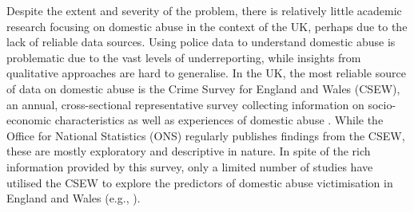 \documentclass[11pt, a4paper]{article}
\begin{document}
Despite the extent and severity of the problem, there is relatively little academic research focusing on domestic abuse in the context of the UK, perhaps due to the lack of reliable data sources. Using police data to understand domestic abuse is problematic due to the vast levels of underreporting, while insights from qualitative approaches are hard to generalise. In the UK, the most reliable source of data on domestic abuse is the Crime Survey for England and Wales (CSEW), an annual, cross-sectional representative survey collecting information on socio-economic characteristics as well as experiences of domestic abuse \cite{OfficeforNationalStatistics2019}.  While the Office for National Statistics (ONS) regularly publishes findings from the CSEW, these are mostly exploratory and descriptive in nature. In spite of the rich information provided by this survey, only a limited number of studies have utilised the CSEW to explore the predictors of domestic abuse victimisation in England and Wales (e.g., ). 


\end{document}
